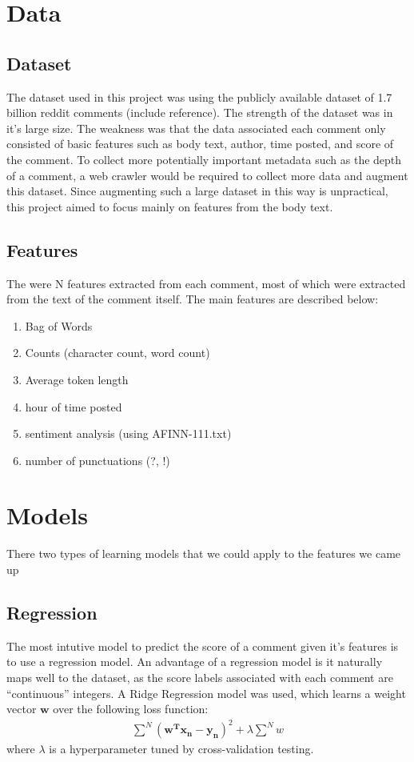 \documentclass[11pt, twocolumn]{article}
\begin{document}
\section{Data}
	\subsection{Dataset}
	The dataset used in this project was using the publicly available dataset of 1.7 billion reddit comments (include reference). The strength of the dataset was in it's large size. The weakness was that the data associated each comment only consisted of basic features such as body text, author, time posted, and score of the comment. To collect more potentially important metadata such as the depth of a comment, a web crawler would be required to collect more data and augment this dataset. Since augmenting such a large dataset in this way is unpractical, this project aimed to focus mainly on features from the body text.
	
	\subsection{Features}
	The were N features extracted from each comment, most of which were extracted from the text of the comment itself. The main features are described below:
	\begin{enumerate}
		\item Bag of Words
		\item Counts (character count, word count)
		\item Average token length
		\item hour of time posted
		\item sentiment analysis (using AFINN-111.txt)
		\item number of punctuations (?, !)
	\end{enumerate}

\section{Models}
	There two types of learning models that we could apply to the features we came up
	
	\subsection{Regression}
	The most intutive model to predict the score of a comment given it's features is to use a regression model. An advantage of a regression model is it naturally maps well to the dataset, as the score labels associated with each comment are ``continuous'' integers. A Ridge Regression model was used, which learns a weight vector $\mathbf{w}$ over the following loss function:
	\begin{gather*}
		\sum^N{ (\mathbf{w^T} \mathbf{x_n} - \mathbf{y_n})^2} + \lambda \sum^N{ w }
	\end{gather*}
	where $\lambda$ is a hyperparameter tuned by cross-validation testing.
	
\end{document}
